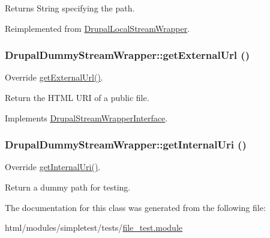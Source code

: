 \begin{DoxyReturn}{Returns}
String specifying the path. 
\end{DoxyReturn}


Reimplemented from \hyperlink{classDrupalLocalStreamWrapper_a3ff87a4643479303f4880f2381d0f432}{DrupalLocalStreamWrapper}.\hypertarget{classDrupalDummyStreamWrapper_a0ab51a9f3ec32db594a32ef4083ae6db}{
\subsubsection[{getExternalUrl}]{\setlength{\rightskip}{0pt plus 5cm}DrupalDummyStreamWrapper::getExternalUrl ()}}
\label{classDrupalDummyStreamWrapper_a0ab51a9f3ec32db594a32ef4083ae6db}
Override \hyperlink{classDrupalDummyStreamWrapper_a0ab51a9f3ec32db594a32ef4083ae6db}{getExternalUrl()}.

Return the HTML URI of a public file. 

Implements \hyperlink{interfaceDrupalStreamWrapperInterface_af8474357b8c79f1a7629084a05541d16}{DrupalStreamWrapperInterface}.\hypertarget{classDrupalDummyStreamWrapper_a7030782108cc094b3d8922d414b37f98}{
\subsubsection[{getInternalUri}]{\setlength{\rightskip}{0pt plus 5cm}DrupalDummyStreamWrapper::getInternalUri ()}}
\label{classDrupalDummyStreamWrapper_a7030782108cc094b3d8922d414b37f98}
Override \hyperlink{classDrupalDummyStreamWrapper_a7030782108cc094b3d8922d414b37f98}{getInternalUri()}.

Return a dummy path for testing. 

The documentation for this class was generated from the following file:\begin{DoxyCompactItemize}
\item 
html/modules/simpletest/tests/\hyperlink{file__test_8module}{file\_\-test.module}\end{DoxyCompactItemize}
